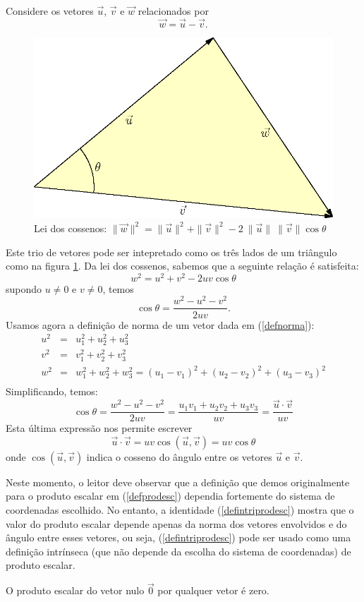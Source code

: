 Considere os vetores $\vec{u}$, $\vec{v}$ e $\vec{w}$ relacionados por $$\vec{w}=\vec{u}-\vec{v}.$$
\begin{figure}\begin{center}
        \includegraphics[width=\textwidth]{./cap_algvet/figs/cossenos} %
    \caption{Lei dos cossenos: $\|\vec{w}\|^2=\|\vec{u}\|^2+\|\vec{v}\|^2-2~\!\|\vec{u}\|~\!\|\vec{v}\|\cos\theta$}\label{leicossenos}
    \end{center}
\end{figure}
Este trio de vetores pode ser intepretado como os três lados de um triângulo como na figura \ref{leicossenos}. Da lei dos cossenos, sabemos que a seguinte relação é satisfeita:
 $$w^2=u^2+v^2-2uv\cos\theta$$
supondo $u\neq 0$ e $v\neq 0$, temos
$$\cos\theta = \frac{w^2-u^2-v^2}{2uv}.$$
Usamos agora a definição de norma de um vetor dada em (\ref{defnorma}):
\begin{eqnarray*}
u^2&=&u_1^2+u_2^2+u_3^2\\
v^2&=&v_1^2+v_2^2+v_3^2\\
w^2&=&w_1^2+w_2^2+w_3^2=\left(u_1-v_1\right)^2+\left(u_2-v_2\right)^2+\left(u_3-v_3\right)^2\\
\end{eqnarray*}
Simplificando, temos:
$$\cos\theta = \frac{w^2-u^2-v^2}{2uv}=\frac{u_1v_1+u_2v_2+u_3v_3}{uv}=\frac{\vec{u}\cdot\vec{v}}{uv}$$
Esta última expressão nos permite escrever
\begin{equation}\label{defintriprodesc}
\vec{u}\cdot\vec{v}=uv\cos\left(\vec{u},\vec{v}\right)=uv\cos\theta
\end{equation}
onde $\cos\left(\vec{u},\vec{v}\right)$ indica o cosseno do ângulo entre os vetores $\vec{u}$ e $\vec{v}$.
\begin{obs}Neste momento, o leitor deve observar que a definição que demos originalmente para o produto escalar em (\ref{defprodesc}) dependia fortemente do sistema de coordenadas escolhido. No entanto, a identidade (\ref{defintriprodesc}) mostra que o valor do produto escalar depende apenas da norma dos vetores envolvidos e do ângulo entre esses vetores, ou seja,  (\ref{defintriprodesc}) pode ser usado como uma definição intrínseca (que não depende da escolha do sistema de coordenadas) de produto escalar. \end{obs}
\begin{obs}O produto escalar do vetor nulo $\vec{0}$ por qualquer vetor é zero.\end{obs}


